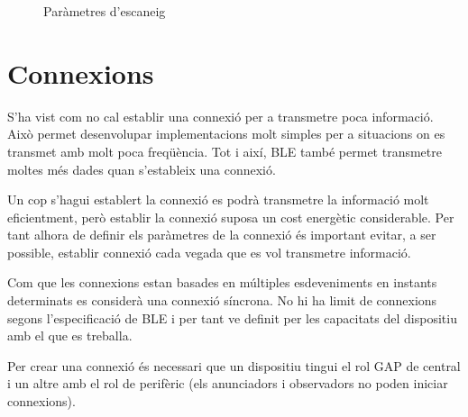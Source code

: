 \begin{figure}[!h]
	\begin{center}
		\begin{subfigmatrix}{1}
		\end{subfigmatrix}
	\end{center}
	\caption{Paràmetres d'escaneig}
	\label{fig:escaneig_canals}
\end{figure}

\section{Connexions}
S'ha vist com no cal establir una connexió per a transmetre poca informació.
Això permet desenvolupar implementacions molt simples per a situacions on es transmet amb molt poca freqüència. Tot i així, BLE també permet transmetre moltes més dades quan s'estableix una connexió.

Un cop s'hagui establert la connexió es podrà transmetre la informació molt eficientment, però establir la connexió suposa un cost energètic considerable.
Per tant alhora de definir els paràmetres de la connexió és important evitar, a ser possible, establir connexió cada vegada que es vol transmetre informació.

Com que les connexions estan basades en múltiples esdeveniments en instants determinats es considerà una connexió síncrona.
No hi ha limit de connexions segons l'especificació de BLE i per tant ve definit per les capacitats del dispositiu amb el que es treballa.

Per crear una connexió és necessari que un dispositiu tingui el rol GAP de central i un altre amb el rol de perifèric (els anunciadors i observadors no poden iniciar connexions).

